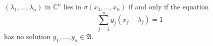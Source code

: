 
$(\lambda_1, \ldots, \lambda_n)$ in $\mathbb{C}^n$ lies in $\sigma(x_1, \ldots, x_n)$ if and only if the equation
$$\sum_{j=1}^{n} y_j(x_j - \lambda_j) = 1$$
has no solution $y_1, \ldots, y_n \in \mathfrak{A}$.
